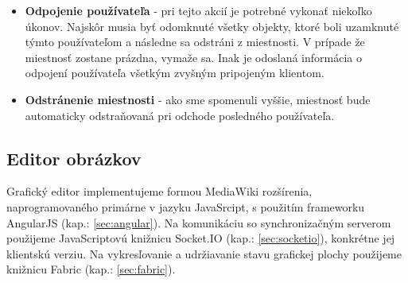 \begin{itemize}
	\item \textbf{Odpojenie používateľa} - pri tejto akcií je potrebné vykonať niekoľko úkonov. Najskôr musia byť odomknuté všetky objekty, ktoré boli uzamknuté týmto používateľom a následne sa odstráni z miestnosti. V prípade že miestnosť zostane prázdna, vymaže sa. Inak je odoslaná informácia o odpojení používateľa všetkým zvyšným pripojeným klientom.
	
	\item \textbf{Odstránenie miestnosti} - ako sme spomenuli vyššie, miestnosť bude automaticky odstraňovaná pri odchode posledného používateľa.
	
\end{itemize}

\subsection{Editor obrázkov}
Grafický editor implementujeme formou MediaWiki rozšírenia, naprogramovaného primárne v jazyku JavaSrcipt, s použitím frameworku AngularJS (kap.: \ref{sec:angular}). Na komunikáciu so synchronizačným serverom použijeme JavaScriptovú knižnicu Socket.IO (kap.: \ref{sec:socketio}), konkrétne jej klientskú verziu. Na vykresľovanie a udržiavanie stavu grafickej plochy použijeme knižnicu Fabric (kap.: \ref{sec:fabric}). 

